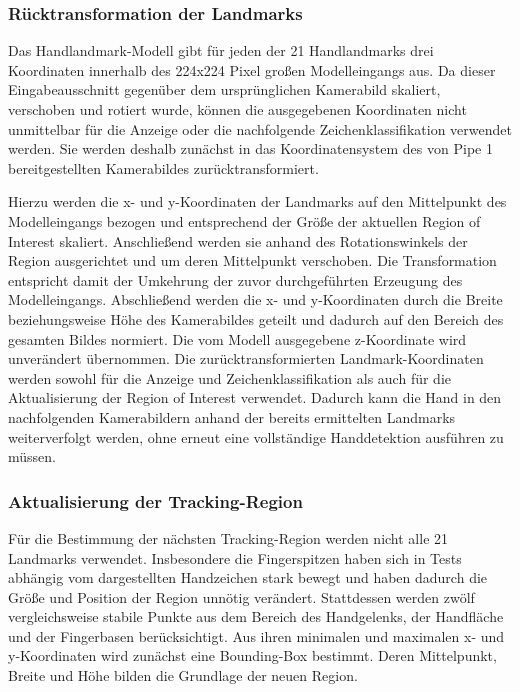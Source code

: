 \subsubsection{Rücktransformation der Landmarks}\label{ssub:landmark-ruecktransformation}

Das Handlandmark-Modell gibt für jeden der 21 Handlandmarks drei Koordinaten innerhalb des 224x224 Pixel großen Modelleingangs aus. Da dieser Eingabeausschnitt gegenüber dem ursprünglichen Kamerabild skaliert, verschoben und rotiert wurde, können die ausgegebenen Koordinaten nicht unmittelbar für die Anzeige oder die nachfolgende Zeichenklassifikation verwendet werden. Sie werden deshalb zunächst in das Koordinatensystem des von Pipe 1 bereitgestellten Kamerabildes zurücktransformiert.

Hierzu werden die x- und y-Koordinaten der Landmarks auf den Mittelpunkt des Modelleingangs bezogen und entsprechend der Größe der aktuellen Region of Interest skaliert. Anschließend werden sie anhand des Rotationswinkels der Region ausgerichtet und um deren Mittelpunkt verschoben. Die Transformation entspricht damit der Umkehrung der zuvor durchgeführten Erzeugung des Modelleingangs. Abschließend werden die x- und y-Koordinaten durch die Breite beziehungsweise Höhe des Kamerabildes geteilt und dadurch auf den Bereich des gesamten Bildes normiert. Die vom Modell ausgegebene z-Koordinate wird unverändert übernommen. Die zurücktransformierten Landmark-Koordinaten werden sowohl für die Anzeige und Zeichenklassifikation als auch für die Aktualisierung der Region of Interest verwendet. Dadurch kann die Hand in den nachfolgenden Kamerabildern anhand der bereits ermittelten Landmarks weiterverfolgt werden, ohne erneut eine vollständige Handdetektion ausführen zu müssen.

\subsubsection{Aktualisierung der Tracking-Region}\label{ssub:tracking-aktualisierung}

Für die Bestimmung der nächsten Tracking-Region werden nicht alle 21 Landmarks verwendet. Insbesondere die Fingerspitzen haben sich in Tests abhängig vom dargestellten Handzeichen stark bewegt und haben dadurch die Größe und Position der Region unnötig verändert. Stattdessen werden zwölf vergleichsweise stabile Punkte aus dem Bereich des Handgelenks, der Handfläche und der Fingerbasen berücksichtigt. Aus ihren minimalen und maximalen x- und y-Koordinaten wird zunächst eine Bounding-Box bestimmt. Deren Mittelpunkt, Breite und Höhe bilden die Grundlage der neuen Region.

